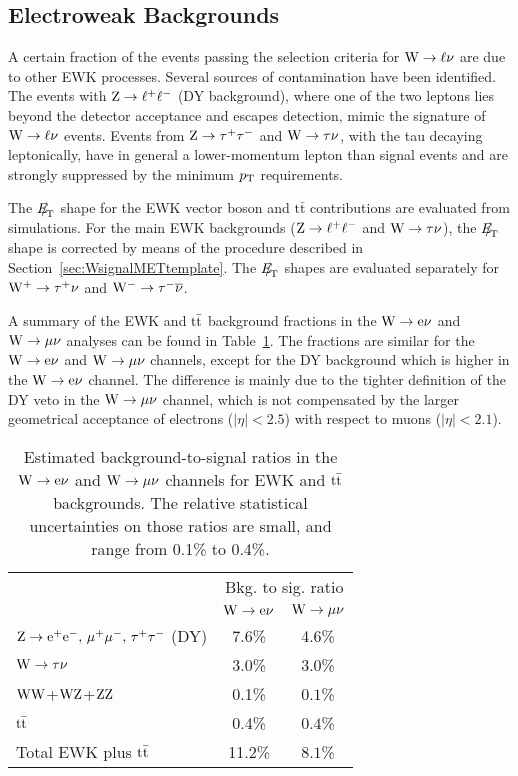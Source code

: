 \subsection{Electroweak Backgrounds}
\label{sec:EWKbkgds}

A certain fraction of the events passing the selection criteria for $\mathrm{W} \rightarrow \ell\nu$
are due to other EWK processes. Several sources of
contamination have been identified. The events with $\mathrm{Z} \rightarrow \ell^+ \ell^-$ 
(DY background), where one of the two leptons lies
beyond the detector acceptance and escapes
detection, mimic the signature of $\mathrm{W} \rightarrow \ell\nu$ events. Events from $\mathrm{Z} \rightarrow \tau^+\tau^-$ and $\mathrm{W} \rightarrow \tau\nu$,
with the tau decaying leptonically, have in general a lower-momentum lepton than signal
events and are strongly suppressed by the minimum $p_{\mathrm{T}}$ requirements.

The ${E\!\!\!/}_{\!\mathrm{T}}$ shape for the EWK vector boson and ${\mathrm t}\bar{\mathrm t}$ contributions are
evaluated from simulations. For the main EWK backgrounds ($\mathrm{Z} \rightarrow \ell^+ \ell^-$ and $\mathrm{W} \rightarrow \tau\nu $), the ${E\!\!\!/}_{\!\mathrm{T}}$ shape is 
corrected by means of the procedure described in Section~\ref{sec:WsignalMETtemplate}.
The ${E\!\!\!/}_{\!\mathrm{T}}$ shapes are evaluated separately for $\mathrm{W^+} \rightarrow \tau^+\nu$ and $\mathrm{W^-} \rightarrow \tau^-\overline{\nu}$.

A summary of the EWK and $\mathrm{t}\bar{\mathrm{t}}$ background fractions in the $\mathrm{W} \rightarrow \mathrm{e}\nu$ and $\mathrm{W} \rightarrow \mu\nu$ analyses can be found in Table~\ref{tab:WlnBG}.
The fractions are similar for the $\mathrm{W} \rightarrow \mathrm{e}\nu$ and $\mathrm{W} \rightarrow \mu\nu$ channels, 
except for the DY background which is higher in the $\mathrm{W} \rightarrow \mathrm{e}\nu$ channel. 
The difference is mainly due to the tighter definition of the DY veto in the $\mathrm{W} \rightarrow \mu\nu$ channel, 
which is not compensated by the larger geometrical acceptance of electrons 
($|\eta|<2.5$) with respect to muons ($|\eta|<2.1$).

\begin{table} %
\begin{center}
\caption{\label{tab:WlnBG}
Estimated background-to-signal ratios in the $\mathrm{W} \rightarrow \mathrm{e}\nu$ and $\mathrm{W} \rightarrow \mu\nu$ channels for EWK and $\mathrm{t}\bar{\mathrm{t}}$ backgrounds.
The relative statistical uncertainties on those ratios are small, and range from 0.1\% to 0.4\%.
}

\begin{tabular}{|l|c|c|}
\hline
{\multirow{2}{*}{Processes}} & \multicolumn{2}{c|}{Bkg. to sig. ratio}  \\ \cline{2-3}
                           & $\mathrm{W} \rightarrow \mathrm{e}\nu$ & $\mathrm{W} \rightarrow \mu\nu$ \\ 
\hline \hline
$\mathrm{Z} \rightarrow \mathrm{e}^+\mathrm{e}^-,\, \mu^+\mu^-,\, \tau^+\tau^-$ (DY)               & 7.6\%  &  4.6\% \\
$\mathrm{W} \rightarrow \tau\nu $                    & 3.0\%  & $3.0$\%    \\
$\mathrm{W}\mathrm{W}$+$\mathrm{W}\mathrm{Z}$+$\mathrm{Z}\mathrm{Z}$ & 0.1\% & $0.1$\%   \\
$\mathrm{t}\bar{\mathrm{t}}$                   & 0.4\% & $0.4$\%   \\
\hline
Total EWK plus $\mathrm{t}\bar{\mathrm{t}}$    & 11.2\%& $8.1$\% \\
\hline
\end{tabular}
\end{center}
\end{table}

